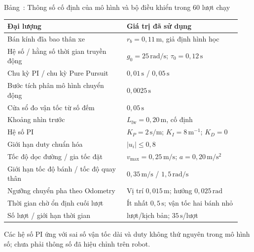 \documentclass[12pt,a4paper,oneside]{report}
\renewcommand{\tablename}{Bảng}
\begin{document}
\begin{center}
\begin{minipage}{\linewidth}
  \centering
  \label{tab:c4-config}
  \tablename~\thetable: Thông số cố định của mô hình và bộ điều khiển trong 60 lượt chạy\par\smallskip
  \small\singlespacing
  \renewcommand{\arraystretch}{1.22}
  \begin{tabular}{@{}>{\raggedright\arraybackslash}p{0.48\linewidth}>{\raggedright\arraybackslash}p{0.46\linewidth}@{}}
    \toprule
    \textbf{Đại lượng} & \textbf{Giá trị đã sử dụng}\\
    \midrule
    Bán kính đĩa bao thân xe & \(r_b=0{,}11\,\mathrm{m}\), giả định hình học\\
    Hệ số / hằng số thời gian truyền động & \(g_0=25\,\mathrm{rad/s}\); \(\tau_0=0{,}12\,\mathrm{s}\)\\
    Chu kỳ PI / chu kỳ Pure Pursuit & \(0{,}01\,\mathrm{s}\) / \(0{,}05\,\mathrm{s}\)\\
    Bước tích phân mô hình chuyển động & \(0{,}0025\,\mathrm{s}\)\\
    Cửa sổ đo vận tốc từ số đếm & \(0{,}05\,\mathrm{s}\)\\
    Khoảng nhìn trước & \(L_{\mathrm{fw}}=0{,}20\,\mathrm{m}\), cố định\\
    Hệ số PI & \(K_P=2\,\mathrm{s/m}\); \(K_I=8\,\mathrm{m}^{-1}\); \(K_D=0\)\\
    Giới hạn duty chuẩn hóa & \(|u_i|\leq0{,}8\)\\
    Tốc độ dọc đường / gia tốc đặt & \(v_{\max}=0{,}25\,\mathrm{m/s}\); \(a=0{,}20\,\mathrm{m/s^2}\)\\
    Giới hạn tốc độ bánh / tốc độ quay thân & \(0{,}35\,\mathrm{m/s}\) / \(1{,}5\,\mathrm{rad/s}\)\\
    Ngưỡng chuyển pha theo Odometry & Vị trí \(0{,}015\,\mathrm{m}\); hướng \(0{,}025\,\mathrm{rad}\)\\
    Thời gian chờ ổn định cuối lượt & Ít nhất \(0{,}5\,\mathrm{s}\); vận tốc hai bánh nhỏ\\
    Số lượt / giới hạn thời gian & 30 lượt/kịch bản; \(35\,\mathrm{s}\)/lượt\\
    \bottomrule
  \end{tabular}
  \par\smallskip\begin{minipage}{0.97\linewidth}\footnotesize Các hệ số PI ứng với sai số vận tốc dài và duty không thứ nguyên trong mô hình số; chưa phải thông số đã hiệu chỉnh trên robot.\end{minipage}
\end{minipage}
\end{center}
\end{document}
